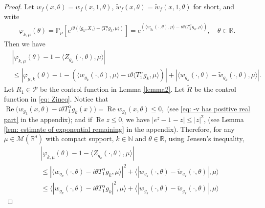 \documentclass[12pt, a4paper]{amsart}
\theoremstyle{definition}
\numberwithin{equation}{section}
\begin{document}
\begin{proof}
    Let $ w_f(x,\theta)=w_f(x,1,\theta)$, $\tilde{w}_f(x,\theta)=\tilde{w}_f(x,1,\theta)$ for short, and write
\begin{align}
\label{eq: definition of varphi-mu-k-theta}
    \varphi_{k,\mu}(\theta)
    =\mathbb{P}_{\mu}[e^{i\theta(\langle g_k, X_1\rangle-\langle T_1^{\alpha}g_k,\mu \rangle)}]
    =e^{(\langle w_{g_k}(\cdot,\theta),\mu \rangle-i\theta \langle T_1^{\alpha} g_k, \mu \rangle)},
    \quad \theta \in \mathbb R.
\end{align}
    Then we have
\begin{align*}
    &|\varphi_{k,\mu}(\theta)-1-\langle Z_{g_k}(\cdot, \theta),\mu\rangle|\\
    &\leq|\varphi_{\mu,k}(\theta)-1-\left( \langle w_{g_k}(\cdot,\theta), \mu \rangle-i\theta \langle T_1^{\alpha}g_k,\mu\rangle\right)| + |\langle w_{g_k}(\cdot,\theta)-\tilde{w}_{g_k}(\cdot,\theta),\mu \rangle|.
\end{align*}
    Let $R_1\in \mathcal P$ be the control function in Lemma \ref{lemma2}. 
    Let $\tilde R$ be the control function in \eqref{eq: Zineq}. 
    Notice that
$
    \operatorname{Re} \big(w_{g_k}(x,\theta) - i\theta T_1^\alpha g_k(x)\big)
    = \operatorname{Re} w_{g_k}(x,\theta)
    \leq 0,
$
    (see \eqref{eq: -v has positive real part} in the appendix); and if $ \operatorname{Re} z\leq 0$, we have $|e^z-1-z|\leq |z|^2$, (see Lemma \ref{lem: estimate of exponential remaining} in the appendix). 
    Therefore, for any $\mu\in \mathcal M(\mathbb R^d)$ with compact support, $k \in \mathbb{N}$ and $\theta \in \mathbb{R}$, using Jensen's inequality,
\begin{align*}
    &|\varphi_{k,\mu}(\theta)-1- \langle Z_{g_k}(\cdot, \theta),\mu\rangle|\\
    &\leq |\langle w_{g_k}(\cdot,\theta)-i\theta T_1^{\alpha}g_k, \mu \rangle|^2 + \langle |w_{g_k}(\cdot,\theta)-\tilde{w}_{g_k}(\cdot,\theta)|, \mu \rangle
    \\&\leq \langle |w_{g_k}(\cdot,\theta)-i\theta T_1^{\alpha}g_k|^2, \mu \rangle + \langle |w_{g_k}(\cdot,\theta)-\tilde{w}_{g_k}(\cdot,\theta)|, \mu \rangle

\end{align*}
\end{proof}
\end{document}
